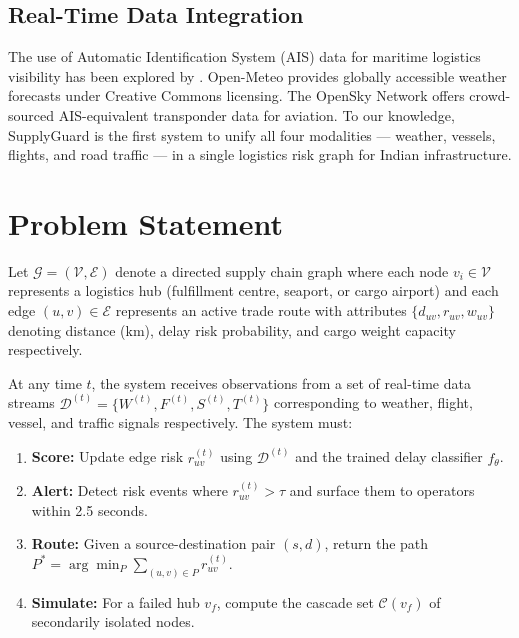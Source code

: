 \documentclass[conference]{IEEEtran}
\begin{document}
\subsection{Real-Time Data Integration}
The use of Automatic Identification System (AIS) data for maritime
logistics visibility has been explored by \cite{ais_logistics}.
Open-Meteo \cite{openmeteo} provides globally accessible weather
forecasts under Creative Commons licensing. The OpenSky Network
\cite{opensky} offers crowd-sourced AIS-equivalent transponder data
for aviation. To our knowledge, SupplyGuard is the first system to
unify all four modalities — weather, vessels, flights, and road
traffic — in a single logistics risk graph for Indian infrastructure.


\section{Problem Statement}

Let $\mathcal{G} = (\mathcal{V}, \mathcal{E})$ denote a directed
supply chain graph where each node $v_i \in \mathcal{V}$ represents
a logistics hub (fulfillment centre, seaport, or cargo airport) and
each edge $(u, v) \in \mathcal{E}$ represents an active trade route
with attributes $\{d_{uv}, r_{uv}, w_{uv}\}$ denoting distance
(km), delay risk probability, and cargo weight capacity respectively.

At any time $t$, the system receives observations from a set of
real-time data streams $\mathcal{D}^{(t)} = \{W^{(t)}, F^{(t)},
S^{(t)}, T^{(t)}\}$ corresponding to weather, flight, vessel, and
traffic signals respectively. The system must:

\begin{enumerate}
  \item \textbf{Score:} Update edge risk $r_{uv}^{(t)}$ using
    $\mathcal{D}^{(t)}$ and the trained delay classifier $f_\theta$.
  \item \textbf{Alert:} Detect risk events where $r_{uv}^{(t)} > \tau$
    and surface them to operators within 2.5 seconds.
  \item \textbf{Route:} Given a source-destination pair $(s, d)$,
    return the path $P^* = \arg\min_P \sum_{(u,v)\in P} r_{uv}^{(t)}$.
  \item \textbf{Simulate:} For a failed hub $v_f$, compute the
    cascade set $\mathcal{C}(v_f)$ of secondarily isolated nodes.
\end{enumerate}
\end{document}
